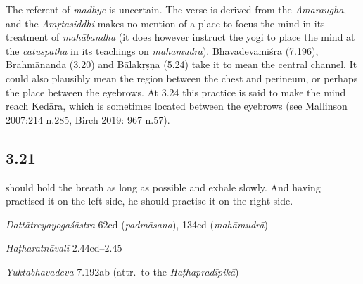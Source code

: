 \begin{ekdosis}
\begin{philcomm}[hp03_020]
The referent of \emph{madhye} is uncertain. The verse is derived from the \emph{Amaraugha}, and the \emph{Amṛtasiddhi} makes no mention of a place to focus the mind in its treatment of \emph{mahābandha} (it does however instruct the yogi to place the mind at the \emph{catuṣpatha} in its teachings on \emph{mahāmudrā}). Bhavadevamiśra (7.196), Brahmānanda (3.20) and Bālakṛṣṇa (5.24) take it to mean the central channel. It could also plausibly mean the region between the chest and perineum, or perhaps the place between the eyebrows. At 3.24 this practice is said to make the mind reach Kedāra, which is sometimes located between the eyebrows (see Mallinson 2007:214 n.285, Birch 2019: 967 n.57).
\end{philcomm}

\subsection*{3.21}
\begin{translation} should hold the breath as long as possible and exhale slowly. And having practised it on the left side, he should practise it on the right side. 
\end{translation}

\begin{sources}[hp03_021]
\emph{Dattātreyayogaśāstra} 62cd (\emph{padmāsana}), 134cd (\emph{mahāmudrā})
\begin{versinnote}
\end{versinnote}
\end{sources}

\begin{testimonia}[hp03_021]
\emph{Haṭharatnāvalī} 2.44cd–2.45
\begin{versinnote}
\end{versinnote}

\emph{Yuktabhavadeva} 7.192ab (attr.~to the \emph{Haṭhapradīpikā})
\begin{versinnote}
\end{versinnote}
\end{testimonia}


\end{ekdosis}
